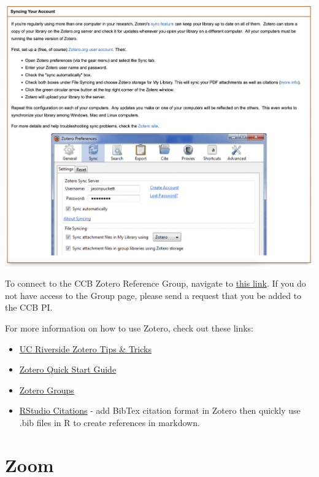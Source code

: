 \documentclass[
]{book}
\providecommand{\tightlist}{%
  \setlength{\itemsep}{0pt}\setlength{\parskip}{0pt}}
\begin{document}
\begin{center}\includegraphics[width=22.14in]{images/zoterosyncing} \end{center}

To connect to the CCB Zotero Reference Group, navigate to \href{https://www.zotero.org/groups/4734848/ccbucr}{this link}. If you do not have access to the Group page, please send a request that you be added to the CCB PI.

For more information on how to use Zotero, check out these links:

\begin{itemize}
\tightlist
\item
  \href{https://guides.lib.ucr.edu/c.php?g=171064\&p=1126842}{UC Riverside Zotero Tips \& Tricks}
\item
  \href{https://www.zotero.org/support/quick_start_guide}{Zotero Quick Start Guide}
\item
  \href{https://www.zotero.org/support/groups}{Zotero Groups}
\item
  \href{https://www.youtube.com/watch?v=zuuOYjE8m98}{RStudio Citations} - add BibTex citation format in Zotero then quickly use .bib files in R to create references in markdown.
\end{itemize}

\hypertarget{zoom}{%
\section{Zoom}\label{zoom}}
\end{document}
